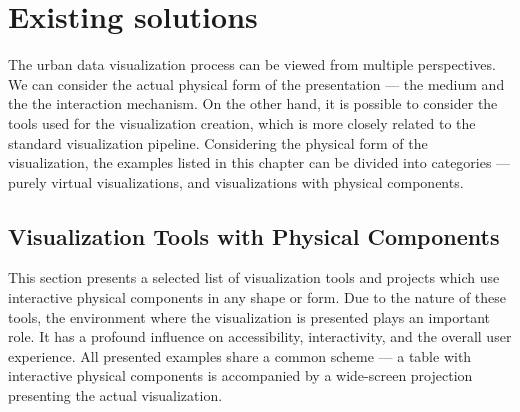 \chapter{Existing solutions}
The urban data visualization process can be viewed from multiple perspectives. We can consider the actual physical form of the presentation --- the medium and the the interaction mechanism. On the other hand, it is possible to consider the tools used for the visualization creation, which is more closely related to the standard visualization pipeline. Considering the physical form of the visualization, the examples listed in this chapter can be divided into categories --- purely virtual visualizations, and visualizations with physical components.

\section{Visualization Tools with Physical Components}
This section presents a selected list of visualization tools and projects which use interactive physical components in any shape or form. Due to the nature of these tools, the environment where the visualization is presented plays an important role. It has a profound influence on accessibility, interactivity, and the overall user experience. All presented examples share a common scheme --- a table with interactive physical components is accompanied by a wide-screen projection presenting the actual visualization.   


